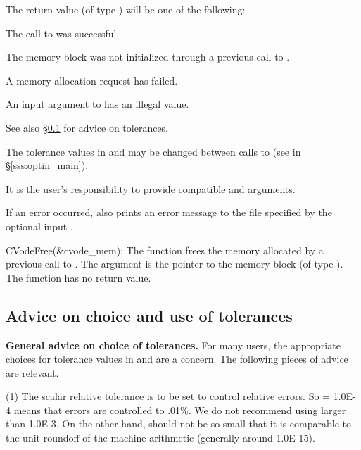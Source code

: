 {
  The return value  (of type ) will be one of the following:
  \begin{args}
  \item[\Id{CV\_SUCCESS}]
    The call to  was successful.
  \item[\Id{CV\_MEM\_NULL}] 
    The {\cvodes} memory block was not initialized through a previous call
    to .
  \item[\Id{CV\_MEM\_FAIL}] 
    A memory allocation request has failed.
  \item[\Id{CV\_ILL\_INPUT}] 
    An input argument to  has an illegal value.
  \end{args}
}
{
  See also \S\ref{sss:tol_advice} for advice on tolerances.

  The tolerance values in  and  may be changed between
  calls to  (see  in \S\ref{sss:optin_main}).

  {\warn}It is the user's responsibility to provide compatible  and
   arguments.

  If an error occurred,  also prints an error message to the
  file specified by the optional input .
}
{
  CVodeFree(\&cvode\_mem);
}
{
  The function  frees the memory allocated by
  a previous call to .
}
{
  The argument is the pointer to the {\cvodes} memory block (of type ).
}
{
  The function  has no return value.
}
{}


\subsection{Advice on choice and use of tolerances}\label{sss:tol_advice}

{\bf General advice on choice of tolerances.}
For many users, the appropriate choices for tolerance values in
 and  are a concern.  The following pieces of
advice are relevant.

(1) The scalar relative tolerance  is to be set to control relative
errors.  So  = 1.0E-4 means that errors are controlled to .01\%.  We
do not recommend using  larger than 1.0E-3.  On the other hand,
 should not be so small that it is comparable to the unit roundoff
of the machine arithmetic (generally around 1.0E-15).

